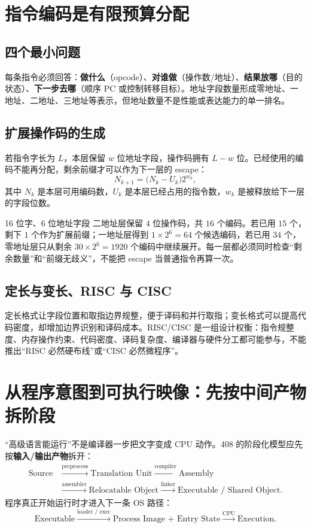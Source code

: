 \documentclass[UTF8,fontset=fandol,11pt,a4paper]{ctexart}
\newcommand{\kw}[1]{\textbf{\color{deep}#1}}
\begin{document}
\section{指令编码是有限预算分配}

\subsection{四个最小问题}
每条指令必须回答：\kw{做什么}（opcode）、\kw{对谁做}（操作数/地址）、\kw{结果放哪}（目的状态）、\kw{下一步去哪}（顺序 PC 或控制转移目标）。地址字段数量形成零地址、一地址、二地址、三地址等表示，但地址数量不是性能或表达能力的单一排名。

\subsection{扩展操作码的生成}
若指令字长为 $L$，本层保留 $w$ 位地址字段，操作码拥有 $L-w$ 位。已经使用的编码不能再分配，剩余前缀才可以作为下一层的 escape：
\[
N_{k+1}=\bigl(N_k-U_k\bigr)2^{w_k},
\]
其中 $N_k$ 是本层可用编码数，$U_k$ 是本层已经占用的指令数，$w_k$ 是被释放给下一层的字段位数。

\begin{examplebox}{16 位字、6 位地址字段}
二地址层保留 $4$ 位操作码，共 $16$ 个编码。若已用 $15$ 个，剩下 $1$ 个作为扩展前缀；一地址层得到 $1\times2^6=64$ 个候选编码，若已用 $34$ 个，零地址层只从剩余 $30\times2^6=1920$ 个编码中继续展开。每一层都必须同时检查“剩余数量”和“前缀无歧义”，不能把 escape 当普通指令再算一次。
\end{examplebox}

\subsection{定长与变长、RISC 与 CISC}
定长格式让字段位置和取指边界规整，便于译码和并行取指；变长格式可以提高代码密度，却增加边界识别和译码成本。RISC/CISC 是一组设计权衡：指令规整度、内存操作约束、代码密度、译码复杂度、编译器与硬件分工都可能参与，不能推出“RISC 必然硬布线”或“CISC 必然微程序”。

\section{从程序意图到可执行映像：先按中间产物拆阶段}
“高级语言能运行”不是编译器一步把文字变成 CPU 动作。408 的阶段化模型应先按\kw{输入/输出产物}拆开：
\[
\begin{aligned}
\text{Source}&\xrightarrow{\text{preprocess}}\text{Translation Unit}
\xrightarrow{\text{compiler}}\text{Assembly}\\
&\xrightarrow{\text{assembler}}\text{Relocatable Object}
\xrightarrow{\text{linker}}\text{Executable / Shared Object}.
\end{aligned}
\]
程序真正开始运行时才进入下一条 OS 路径：
\[
\text{Executable}
\xrightarrow{\text{loader / exec}}
\text{Process Image + Entry State}
\xrightarrow{\text{CPU}}
\text{Execution}.
\]
\end{document}
